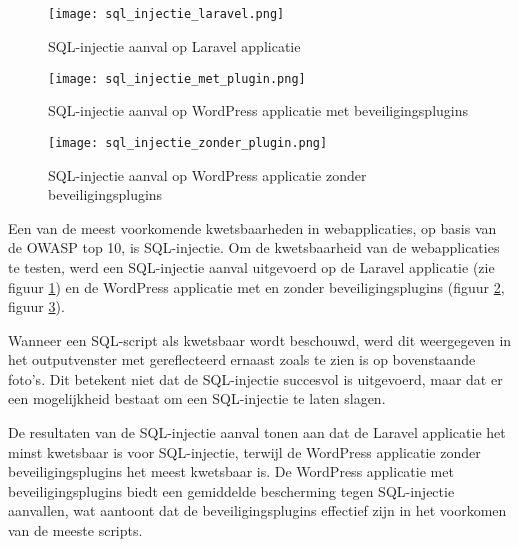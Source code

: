 \subsection{}
\begin{figure}
    \centering
    \texttt{[image: sql\_injectie\_laravel.png]}
    \caption[SQL-injectie aanval op Laravel applicatie]{SQL-injectie aanval op Laravel applicatie}
    \label{fig:injectie_laravel}
\end{figure}
\begin{figure}
    \centering
    \texttt{[image: sql\_injectie\_met\_plugin.png]}
    \caption[SQL-injectie aanval op WordPress applicatie met beveiligingsplugins]{SQL-injectie aanval op WordPress applicatie met beveiligingsplugins}
    \label{fig:injectie_zonder}
\end{figure}
\begin{figure}
    \centering
    \texttt{[image: sql\_injectie\_zonder\_plugin.png]}
    \caption[SQL-injectie aanval op WordPress applicatie zonder beveiligingsplugins]{SQL-injectie aanval op WordPress applicatie zonder beveiligingsplugins}
    \label{fig:injectie_met}
\end{figure}


Een van de meest voorkomende kwetsbaarheden in webapplicaties, op basis van de OWASP top 10, is SQL-injectie. Om de 
kwetsbaarheid van de webapplicaties 
te testen, werd een SQL-injectie aanval uitgevoerd op de Laravel applicatie (zie figuur \ref{fig:injectie_laravel}) en de 
WordPress applicatie met en zonder beveiligingsplugins (figuur \ref{fig:injectie_zonder}, figuur \ref{fig:injectie_met}). 

Wanneer een SQL-script als kwetsbaar wordt beschouwd, werd dit weergegeven in het outputvenster met gereflecteerd ernaast 
zoals te zien is op bovenstaande foto's. 
Dit betekent niet dat de SQL-injectie succesvol is uitgevoerd, maar dat er een mogelijkheid bestaat om een SQL-injectie te laten 
slagen. 

De resultaten van de SQL-injectie aanval tonen aan dat de Laravel applicatie het minst kwetsbaar is voor SQL-injectie, terwijl 
de WordPress applicatie zonder beveiligingsplugins het meest kwetsbaar is. De WordPress applicatie met beveiligingsplugins 
biedt een gemiddelde bescherming tegen SQL-injectie aanvallen, wat aantoont dat de beveiligingsplugins effectief zijn in het 
voorkomen van de meeste scripts. 

